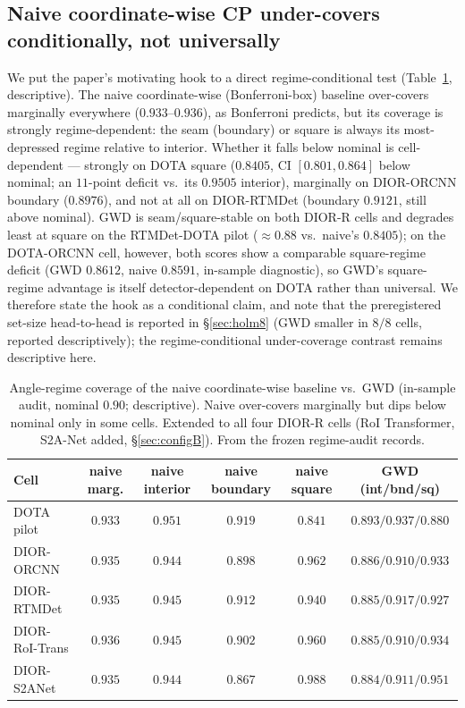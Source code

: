 \documentclass[journal]{IEEEtran}
\begin{document}
\subsection{Naive coordinate-wise CP under-covers conditionally, not universally}
We put the paper's motivating hook to a direct regime-conditional test (Table~\ref{tab:naive}, descriptive).
The naive coordinate-wise (Bonferroni-box) baseline over-covers marginally everywhere
($0.933$--$0.936$), as Bonferroni predicts, but its coverage is strongly regime-dependent: the seam
(boundary) or square is always its most-depressed regime relative to interior. Whether it falls below
nominal is cell-dependent --- strongly on DOTA square ($0.8405$, CI $[0.801,0.864]$ below nominal; an $11$-point
deficit vs.\ its $0.9505$ interior), marginally on DIOR-ORCNN boundary ($0.8976$), and not at all on
DIOR-RTMDet (boundary $0.9121$, still above nominal). GWD is seam/square-stable on both DIOR-R cells and
degrades least at square on the RTMDet-DOTA pilot ($\approx0.88$ vs.\ naive's $0.8405$); on the DOTA-ORCNN
cell, however, both scores show a comparable square-regime deficit (GWD $0.8612$, naive $0.8591$,
in-sample diagnostic), so GWD's square-regime advantage is itself detector-dependent on DOTA rather than
universal. We therefore state the hook as a conditional claim, and note that the
preregistered set-size head-to-head is reported in \S\ref{sec:holm8} (GWD smaller in $8/8$ cells,
reported descriptively); the regime-conditional under-coverage contrast remains descriptive here.

\begin{table}[!t]\centering\small
\caption{Angle-regime coverage of the naive coordinate-wise baseline vs.\ GWD (in-sample audit, nominal
$0.90$; descriptive). Naive over-covers marginally but dips below nominal only in some cells. Extended to all
four DIOR-R cells (RoI Transformer, S2A-Net added, \S\ref{sec:configB}). From the
frozen regime-audit records.}\label{tab:naive}
\begin{tabular}{lccccc}
\toprule
Cell & naive marg. & naive interior & naive boundary & naive square & GWD (int/bnd/sq) \\
\midrule
DOTA pilot        & $0.933$ & $0.951$ & $0.919$ & $0.841$ & $0.893/0.937/0.880$ \\
DIOR-ORCNN        & $0.935$ & $0.944$ & $0.898$ & $0.962$ & $0.886/0.910/0.933$ \\
DIOR-RTMDet       & $0.935$ & $0.945$ & $0.912$ & $0.940$ & $0.885/0.917/0.927$ \\
DIOR-RoI-Trans    & $0.936$ & $0.945$ & $0.902$ & $0.960$ & $0.885/0.910/0.934$ \\
DIOR-S2ANet       & $0.935$ & $0.944$ & $0.867$ & $0.988$ & $0.884/0.911/0.951$ \\
\bottomrule
\end{tabular}
\end{table}
\end{document}
